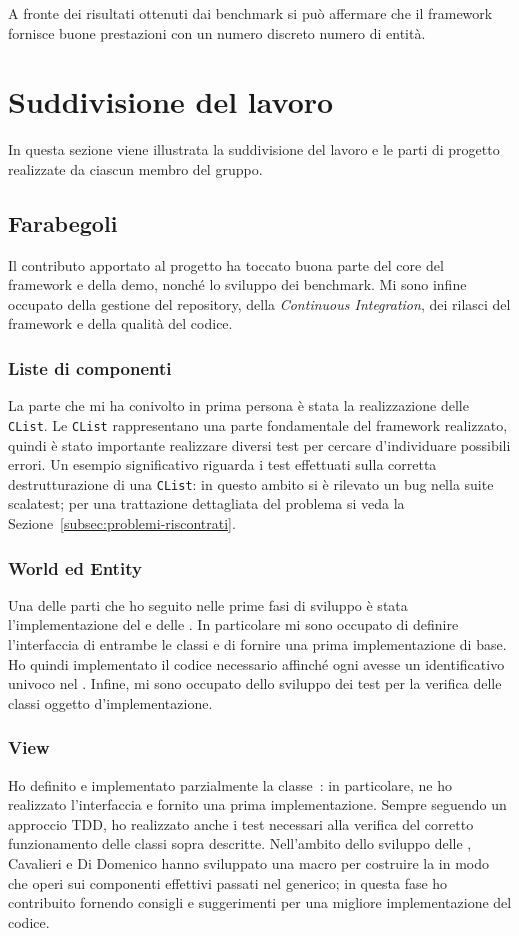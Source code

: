 A fronte dei risultati ottenuti dai benchmark si può affermare che il framework fornisce buone prestazioni con un numero
discreto numero di entità.

\section{Suddivisione del lavoro}\label{sec:suddivisione-del-lavoro}
In questa sezione viene illustrata la suddivisione del lavoro e le parti di progetto realizzate da ciascun membro del
gruppo.

\subsection{Farabegoli}\label{subsec:farabegoli}
Il contributo apportato al progetto ha toccato buona parte del core del framework e della demo, nonché lo sviluppo
dei benchmark.
Mi sono infine occupato della gestione del repository, della \textit{Continuous Integration}, dei rilasci del framework
e della qualità del codice.

\subsubsection{Liste di componenti}
La parte che mi ha conivolto in prima persona è stata la realizzazione delle \texttt{CList}.
Le \texttt{CList} rappresentano una parte fondamentale del framework realizzato, quindi è stato importante realizzare
diversi test per cercare d'individuare possibili errori.
Un esempio significativo riguarda i test effettuati sulla corretta destrutturazione di una \texttt{CList}: in questo
ambito si è rilevato un bug nella suite scalatest;
per una trattazione dettagliata del problema si veda la Sezione~\ref{subsec:problemi-riscontrati}.

\subsubsection{World ed Entity}
Una delle parti che ho seguito nelle prime fasi di sviluppo è stata l'implementazione del \World e delle \Entity.
In particolare mi sono occupato di definire l'interfaccia di entrambe le classi e di fornire una prima implementazione
di base.
Ho quindi implementato il codice necessario affinché ogni \Entity avesse un identificativo univoco nel \World.
Infine, mi sono occupato dello sviluppo dei test per la verifica delle classi oggetto d'implementazione.

\subsubsection{View}
Ho definito e implementato parzialmente la classe~\View: in particolare, ne ho realizzato l'interfaccia e fornito una
prima implementazione.
Sempre seguendo un approccio TDD, ho realizzato anche i test necessari alla verifica del corretto funzionamento delle
classi sopra descritte.
Nell'ambito dello sviluppo delle \View, Cavalieri e Di Domenico hanno sviluppato una macro per costruire la
\View in modo che operi sui componenti effettivi passati nel generico;
in questa fase ho contribuito fornendo consigli e suggerimenti per una migliore implementazione del codice.

